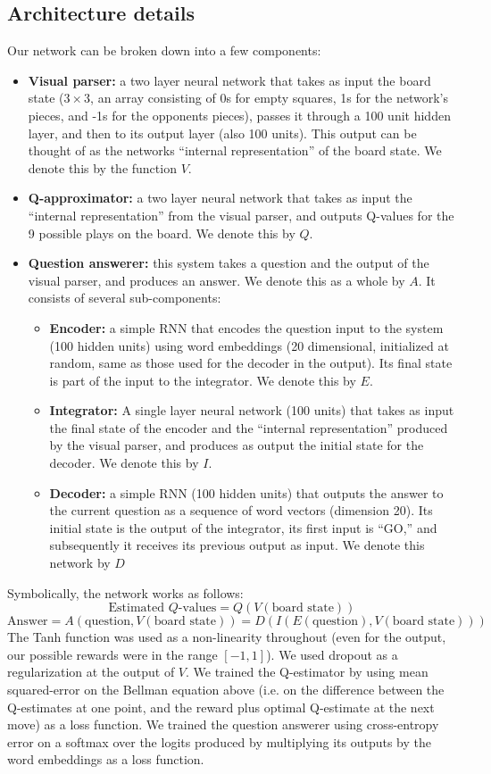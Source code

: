 \documentclass{article} %
\begin{document}
\subsection{Architecture details}
Our network can be broken down into a few components: 
\begin{itemize}
\item \textbf{Visual parser:} a two layer neural network that takes as input the board state (\(3 \times 3\), an array consisting of 0s for empty squares, 1s for the network's pieces, and -1s for the opponents pieces), passes it through a 100 unit hidden layer, and then to its output layer (also 100 units). This output can be thought of as the networks ``internal representation'' of the board state. We denote this by the function \(V\). 
\item \textbf{Q-approximator:} a two layer neural network that takes as input the ``internal representation'' from the visual parser, and outputs Q-values for the 9 possible plays on the board. We denote this by \(Q\). 
\item \textbf{Question answerer:} this system takes a question and the output of the visual parser, and produces an answer. We denote this as a whole by \(A\). It consists of several sub-components:
    \begin{itemize}
	\item \textbf{Encoder:} a simple RNN that encodes the question input to the system (100 hidden units) using word embeddings (20 dimensional, initialized at random, same as those used for the decoder in the output). Its final state is part of the input to the integrator. We denote this by \(E\).
	\item \textbf{Integrator:} A single layer neural network (100 units) that takes as input the final state of the encoder and the ``internal representation'' produced by the visual parser, and produces as output the initial state for the decoder. We denote this by \(I\).
	\item \textbf{Decoder:} a simple RNN (100 hidden units) that outputs the answer to the current question as a sequence of word vectors (dimension 20). Its initial state is the output of the integrator, its first input is ``GO,'' and subsequently it receives its previous output as input. We denote this network by \(D\)
    \end{itemize} 
\end{itemize}
Symbolically, the network works as follows:
\[ 
\text{Estimated } Q\text{-values} = Q(V(\text{board state}))
\]
\[ 
\text{Answer} = A(\text{question},V(\text{board state})) = D(I(E(\text{question}),V(\text{board state})) )
\]
The Tanh function was used as a non-linearity throughout (even for the output, our possible rewards were in the range \([-1,1]\)). We used dropout as a regularization at the output of \(V\). We trained the Q-estimator by using mean squared-error on the Bellman equation above (i.e. on the difference between the Q-estimates at one point, and the reward plus optimal Q-estimate at the next move) as a loss function. We trained the question answerer using cross-entropy error on a softmax over the logits produced by multiplying its outputs by the word embeddings as a loss function.
\end{document}
